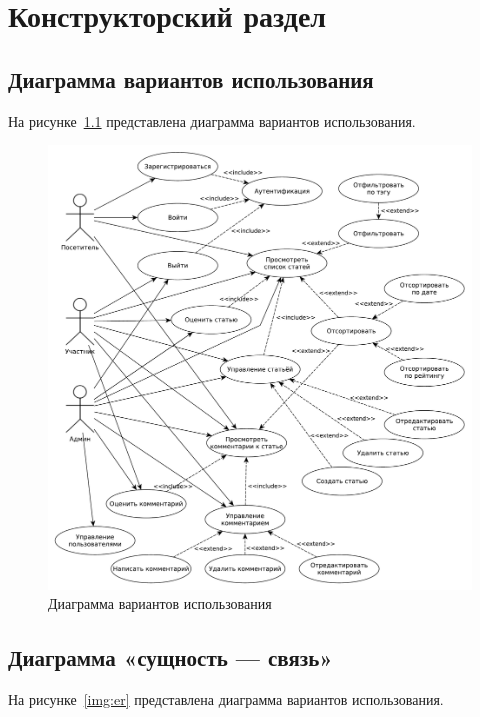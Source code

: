 \chapter{Конструкторский раздел}

\section{Диаграмма вариантов использования}

На рисунке~\ref{img:use-case} представлена диаграмма вариантов использования.

\begin{figure}[H]
	\centering
	\includegraphics[width=\linewidth]{inc/img/use-case.pdf}
	\caption{Диаграмма вариантов использования}
	\label{img:use-case}
\end{figure}

\section{Диаграмма «сущность — связь»}

На рисунке~\ref{img:er} представлена диаграмма вариантов использования.

